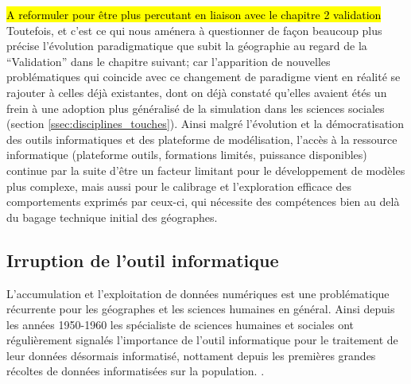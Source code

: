 \hl{A reformuler pour être plus percutant en liaison avec le chapitre 2 validation}
Toutefois, et c'est ce qui nous aménera à questionner de façon beaucoup plus précise l'évolution paradigmatique que subit la géographie au regard de la \enquote{Validation} dans le chapitre suivant; car l'apparition de nouvelles problématiques qui coincide avec ce changement de paradigme vient en réalité se rajouter à celles déjà existantes, dont on déjà constaté qu'elles avaient étés un frein à une adoption plus généralisé de la simulation dans les sciences sociales (section \ref{ssec:disciplines_touches}). Ainsi malgré l'évolution et la démocratisation des outils informatiques et des plateforme de modélisation, l'accès à la ressource informatique (plateforme outils, formations limités, puissance disponibles) continue par la suite d'être un facteur limitant pour le développement de modèles plus complexe, mais aussi pour le calibrage et l'exploration efficace des comportements exprimés par ceux-ci, qui nécessite des compétences bien au delà du bagage technique initial des géographes. 



\subsection{Irruption de l'outil informatique }
\label{sec:apparition_outil_informatique}


L'accumulation et l'exploitation de données numériques est une problématique récurrente pour les géographes et les sciences humaines en général. Ainsi depuis les années 1950-1960 les spécialiste de sciences humaines et sociales ont régulièrement signalés l'importance de l'outil informatique pour le traitement de leur données désormais informatisé, nottament depuis les premières grandes récoltes de données informatisées sur la population. \autocite{Kao1963, Hagerstrand1967b} \autocite[386]{Barnes2011}. 

